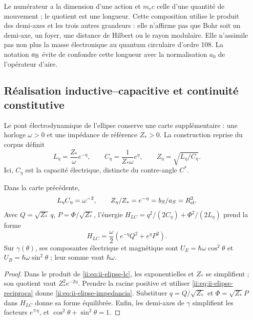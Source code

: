 Le numérateur a la dimension d'une action et \(m_ec\) celle d'une quantité de mouvement ; le
quotient est une longueur. Cette composition utilise le produit des
demi-axes et les trois autres grandeurs : elle n'affirme pas que Bohr soit un demi-axe,
un foyer, une distance de Hilbert ou le rayon modulaire. Elle n'assimile pas non plus
la masse électronique au quantum circulaire d'ordre 108. La notation
\(a_{\rm B}\) évite de confondre cette longueur avec la normalisation
\(a_0\) de l'opérateur d'aire.

\subsection{Réalisation inductive--capacitive et continuité constitutive}
\label{ii:sec:ii-elipse-lc}

Le pont électrodynamique de l'ellipse conserve une carte supplémentaire :
une horloge \(\omega>0\) et une impédance de référence \(Z_*>0\).
La construction reprise du corpus définit
\begin{equation}
 L_\eta=\frac{Z_*}{\omega}e^{-\eta},\qquad
 C_\eta=\frac{1}{Z_*\omega}e^\eta,
 \qquad Z_\eta=\sqrt{L_\eta/C_\eta}.
 \label{ii:eq:ii-elipse-lc}
\end{equation}
Ici, \(C_\eta\) est la capacité électrique, distincte du contre-angle \(C^*\).
\begin{proposition}
\label{ii:prop:ii-elipse-lc}
Dans la carte précédente,
\begin{equation}
 L_\eta C_\eta=\omega^{-2},\qquad
 \frac{Z_\eta}{Z_*}=e^{-\eta}
 =\frac{b_S}{a_S}=R_{\rm el}^{2}.
 \label{ii:eq:ii-elipse-impedancia}
\end{equation}
Avec \(Q=\sqrt{Z_*}\,q\), \(P=\Phi/\sqrt{Z_*}\), l'énergie
\(H_{LC}=q^2/(2C_\eta)+\Phi^2/(2L_\eta)\) prend la forme
\[
 H_{LC}=\frac\omega2(e^{-\eta}Q^2+e^\eta P^2).
\]
Sur \(\gamma(\theta)\), ses composantes électrique et magnétique sont
\(U_E=\hbar\omega\cos^2\theta\) et
\(U_B=\hbar\omega\sin^2\theta\) ; leur somme vaut \(\hbar\omega\).
\end{proposition}
\begin{proof}
Dans le produit de \eqref{ii:eq:ii-elipse-lc}, les exponentielles et
\(Z_*\) se simplifient ; son quotient vaut \(Z_*^2e^{-2\eta}\). Prendre la racine
positive et utiliser \eqref{ii:eq:ii-elipse-reciproca} donne
\eqref{ii:eq:ii-elipse-impedancia}. Substituer \(q=Q/\sqrt{Z_*}\)
et \(\Phi=\sqrt{Z_*}P\) dans \(H_{LC}\) donne sa forme équilibrée.
Enfin, les demi-axes de \(\gamma\) simplifient les facteurs
\(e^{\mp\eta}\), et \(\cos^2\theta+\sin^2\theta=1\).
\end{proof}

